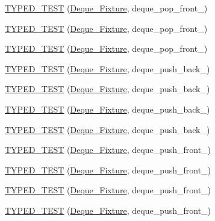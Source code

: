 \begin{DoxyCompactItemize}
\hyperlink{TestDeque_8c_09_09_a4d182d2341ee9910755ca3a51adebdf8}{T\-Y\-P\-E\-D\-\_\-\-T\-E\-S\-T} (\hyperlink{structDeque__Fixture}{Deque\-\_\-\-Fixture}, deque\-\_\-pop\-\_\-front\-\_)
\item 
\hyperlink{TestDeque_8c_09_09_aec72dafbc835f15244c81c49e823b6b2}{T\-Y\-P\-E\-D\-\_\-\-T\-E\-S\-T} (\hyperlink{structDeque__Fixture}{Deque\-\_\-\-Fixture}, deque\-\_\-pop\-\_\-front\-\_)
\item 
\hyperlink{TestDeque_8c_09_09_a89a7bb9d103300bdb90a11c4b16ed857}{T\-Y\-P\-E\-D\-\_\-\-T\-E\-S\-T} (\hyperlink{structDeque__Fixture}{Deque\-\_\-\-Fixture}, deque\-\_\-pop\-\_\-front\-\_)
\item 
\hyperlink{TestDeque_8c_09_09_a14e0cac2b548a0fa8b14c7de8a2590df}{T\-Y\-P\-E\-D\-\_\-\-T\-E\-S\-T} (\hyperlink{structDeque__Fixture}{Deque\-\_\-\-Fixture}, deque\-\_\-push\-\_\-back\-\_)
\item 
\hyperlink{TestDeque_8c_09_09_ad973f69ceba77e273aeed23bcfc79c50}{T\-Y\-P\-E\-D\-\_\-\-T\-E\-S\-T} (\hyperlink{structDeque__Fixture}{Deque\-\_\-\-Fixture}, deque\-\_\-push\-\_\-back\-\_)
\item 
\hyperlink{TestDeque_8c_09_09_ada99677eb94aac3c20bbca1592bea42e}{T\-Y\-P\-E\-D\-\_\-\-T\-E\-S\-T} (\hyperlink{structDeque__Fixture}{Deque\-\_\-\-Fixture}, deque\-\_\-push\-\_\-back\-\_)
\item 
\hyperlink{TestDeque_8c_09_09_a791bcf64d7b3d12e2d490ac35cd366d6}{T\-Y\-P\-E\-D\-\_\-\-T\-E\-S\-T} (\hyperlink{structDeque__Fixture}{Deque\-\_\-\-Fixture}, deque\-\_\-push\-\_\-back\-\_)
\item 
\hyperlink{TestDeque_8c_09_09_ae8090df5cca62a106bdef99d9f5b5af1}{T\-Y\-P\-E\-D\-\_\-\-T\-E\-S\-T} (\hyperlink{structDeque__Fixture}{Deque\-\_\-\-Fixture}, deque\-\_\-push\-\_\-front\-\_)
\item 
\hyperlink{TestDeque_8c_09_09_a16bc088c70bfa66270a1331a9a9b88e2}{T\-Y\-P\-E\-D\-\_\-\-T\-E\-S\-T} (\hyperlink{structDeque__Fixture}{Deque\-\_\-\-Fixture}, deque\-\_\-push\-\_\-front\-\_)
\item 
\hyperlink{TestDeque_8c_09_09_a87d76247019efc9e5b5097eced2710a6}{T\-Y\-P\-E\-D\-\_\-\-T\-E\-S\-T} (\hyperlink{structDeque__Fixture}{Deque\-\_\-\-Fixture}, deque\-\_\-push\-\_\-front\-\_)
\item 
\hyperlink{TestDeque_8c_09_09_aa8f15731c0baed95cc37244d568a5b44}{T\-Y\-P\-E\-D\-\_\-\-T\-E\-S\-T} (\hyperlink{structDeque__Fixture}{Deque\-\_\-\-Fixture}, deque\-\_\-push\-\_\-front\-\_)
\item 

\end{DoxyCompactItemize}
